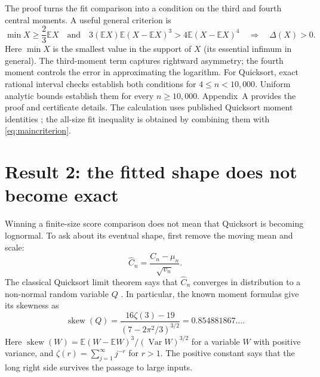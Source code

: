 \documentclass[10pt,letterpaper]{article}
\newcommand{\E}{\mathbb E}
\newcommand{\Var}{\operatorname{Var}}
\begin{document}
The proof turns the fit comparison into a condition on the third and fourth central moments. A useful general criterion is
\begin{equation}
\min X\ge\frac23\E X
\quad\text{and}\quad
3(\E X)\E(X-\E X)^3>4\E(X-\E X)^4
\quad\Longrightarrow\quad\Delta(X)>0.                         \label{eq:maincriterion}
\end{equation}
Here $\min X$ is the smallest value in the support of $X$ (its essential infimum in general). The third-moment term captures rightward asymmetry; the fourth moment controls the error in approximating the logarithm. For Quicksort, exact rational interval checks establish both conditions for $4\le n<10{,}000$. Uniform analytic bounds establish them for every $n\ge10{,}000$. Appendix~A provides the proof and certificate details. The calculation uses published Quicksort moment identities \cite{yao}; the all-size fit inequality is obtained by combining them with \eqref{eq:maincriterion}.

\section{Result 2: the fitted shape does not become exact}
Winning a finite-size score comparison does not mean that Quicksort is becoming lognormal. To ask about its eventual shape, first remove the moving mean and scale:
\begin{equation}
\widehat C_n=\frac{C_n-\mu_n}{\sqrt{v_n}}.                        \label{eq:mainstandard}
\end{equation}
The classical Quicksort limit theorem says that $\widehat C_n$ converges in distribution to a non-normal random variable $Q$ \cite{rosler,filljanson}. In particular, the known moment formulas give its skewness as
\begin{equation}
\operatorname{skew}(Q)
=\frac{16\zeta(3)-19}{(7-2\pi^2/3)^{3/2}}
=0.854881867\ldots.                                               \label{eq:mainskew}
\end{equation}
Here $\operatorname{skew}(W)=\E(W-\E W)^3/(\Var W)^{3/2}$ for a variable $W$ with positive variance, and $\zeta(r)=\sum_{j=1}^{\infty}j^{-r}$ for $r>1$. The positive constant says that the long right side survives the passage to large inputs.
\end{document}
